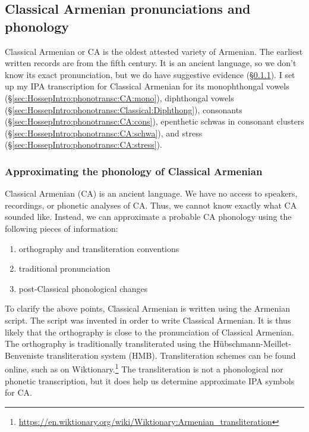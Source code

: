 \subsection{Classical Armenian pronunciations and phonology}\label{sec:HossepIntro:phonotransc:CA}

Classical Armenian or CA is the oldest attested variety of Armenian. The earliest written records are from the fifth century. It is an ancient language, so we don't know its exact pronunciation, but we do have suggestive evidence (\S\ref{sec:HossepIntro:phonotransc:CA:approx}).  I set up my IPA transcription for  Classical Armenian for its monophthongal vowels (\S\ref{sec:HossepIntro:phonotransc:CA:mono}), diphthongal vowels (\S\ref{sec:HossepIntro:phonotransc:Classical:Diphthong}), consonants (\S\ref{sec:HossepIntro:phonotransc:CA:cons}), epenthetic schwas in consonant clusters (\S\ref{sec:HossepIntro:phonotransc:CA:schwa}), and stress (\S\ref{sec:HossepIntro:phonotransc:CA:stress}). 

 

\subsubsection{Approximating   the phonology of Classical Armenian}\label{sec:HossepIntro:phonotransc:CA:approx}
Classical Armenian (CA) is an ancient   language. We have no access to speakers, recordings, or phonetic analyses of CA. Thus, we cannot know exactly what CA sounded like. Instead, we can approximate a probable CA phonology using the following pieces of information:
\begin{enumerate}
	\item orthography and transliteration conventions
		\item traditional pronunciation
\item post-Classical phonological changes
\end{enumerate}

To clarify the above points, Classical Armenian is written using the Armenian script. The script was invented in order to write Classical Armenian. It is thus likely that the orthography is close to the pronunciation of Classical Armenian. The orthography is traditionally transliterated using the Hübschmann-Meillet-Benveniste transliteration system (HMB). Transliteration schemes can be found online, such as on Wiktionary.\footnote{\url{https://en.wiktionary.org/wiki/Wiktionary:Armenian_transliteration}} The transliteration is not a phonological nor phonetic transcription, but it does help us determine approximate IPA symbols for CA. 

